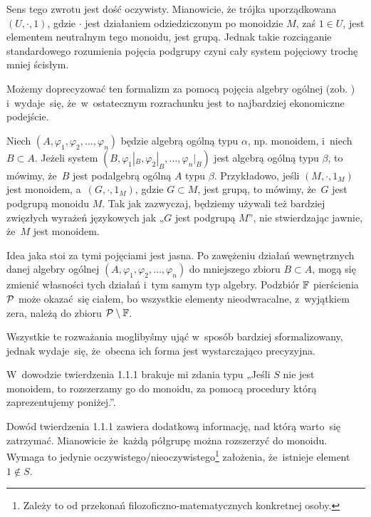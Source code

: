 \documentclass[a4paper,11pt]{article}
\begin{document}
Sens tego zwrotu jest dość oczywisty. Mianowicie, że trójka uporządkowana
$( U, \cdot, 1 )$, gdzie $\cdot$ jest działaniem odziedziczonym po
monoidzie $M$, zaś $1 \in U$, jest elementem neutralnym tego monoidu,
jest grupą. Jednak takie rozciąganie standardowego rozumienia pojęcia podgrupy czyni cały system pojęciowy trochę mniej ścisłym.

Możemy doprecyzować ten formalizm za pomocą pojęcia algebry
ogólnej (zob. \cite{BialynickiBirulaZarysAlgebry1987}) i~wydaje~się, że~w~ostatecznym rozrachunku jest to najbardziej ekonomiczne podejście.

Niech $( A, \varphi_{ 1 }, \varphi_{ 2 }, \ldots, \varphi_{ n } )$ będzie algebrą ogólną typu $\alpha$, np.
monoidem, i~niech $B \subset A$. Jeżeli system
$( B, \varphi_{ 1 }|_{ B }, \varphi_{ 2 }|_{ B }, \ldots, \varphi_{ n }|_{ B } )$ jest algebrą ogólną
typu $\beta$, to mówimy, że~$B$ jest podalgebrą ogólną $A$ typu $\beta$.
Przykładowo, jeśli $( M, \cdot, 1_{ M } )$ jest monoidem, a~$( G, \cdot, 1_{ M } )$,
gdzie $G \subset M$, jest grupą, to mówimy, że~$G$ jest podgrupą monoidu $M$. Tak
jak zazwyczaj, będziemy używali też bardziej zwięzłych wyrażeń językowych
jak „$G$ jest podgrupą $M$”, nie stwierdzając jawnie, że~$M$ jest monoidem.

Idea jaka stoi za tymi pojęciami jest jasna. Po zawężeniu działań
wewnętrznych danej algebry ogólnej $( A, \varphi_{ 1 }, \varphi_{ 2 }, \ldots, \varphi_{ n } )$ do
mniejszego zbioru $B \subset A$, mogą się zmienić własności tych działań i~tym
samym typ algebry. Podzbiór $\mathbb{F}$ pierścienia $\mathcal{P}$ może okazać~się
ciałem, bo wszystkie elementy nieodwracalne, z~wyjątkiem zera, należą do
zbioru $\mathcal{P} \setminus \mathbb{F}$.

Wszystkie te rozważania moglibyśmy ująć w~sposób bardziej sformalizowany,
jednak wydaje~się, że~obecna ich forma jest wystarczająco precyzyjna.

\vspace{\spaceFour}





\start {} W~dowodzie twierdzenia 1.1.1 brakuje mi zdania typu
„Jeśli $S$ nie jest monoidem, to rozszerzamy go do monoidu, za pomocą
procedury którą zaprezentujemy poniżej.”.

\vspace{\spaceFour}





\start {} Dowód twierdzenia 1.1.1 zawiera dodatkową informację,
nad którą warto~się zatrzymać. Mianowicie że~każdą półgrupę można
rozszerzyć do monoidu. Wymaga to jedynie
oczywistego/nieoczywistego\footnote{Zależy to od przekonań
  filozoficzno-matematycznych konkretnej osoby.} założenia, że~istnieje
element $1 \notin S$.
\end{document}
